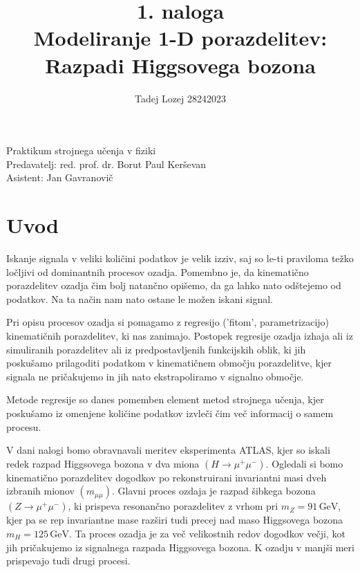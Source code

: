 \documentclass[slovene,11pt,a4paper]{article}
\begin{document}
\title{1. naloga \\ Modeliranje 1-D porazdelitev: Razpadi Higgsovega bozona}
\author{Tadej Lozej 28242023}
\maketitle

\begin{center}
Praktikum strojnega učenja v fiziki \\
\bigskip
Predavatelj: red. prof. dr. Borut Paul Kerševan \\
Asistent: Jan Gavranovič
\end{center}

\newpage

\tableofcontents

\newpage


\section{Uvod}

Iskanje signala v veliki količini podatkov je velik izziv, saj so le-ti praviloma težko ločljivi od dominantnih procesov ozadja. Pomembno je, da kinematično porazdelitev ozadja čim bolj natančno opišemo, da ga lahko nato odštejemo od podatkov. Na ta način nam nato ostane le možen iskani signal.

Pri opisu procesov ozadja si pomagamo z regresijo ('fitom', parametrizacijo) kinematičnih porazdelitev, ki nas zanimajo. Postopek regresije ozadja izhaja ali iz simuliranih porazdelitev ali iz predpostavljenih funkcijskih oblik, ki jih poskušamo prilagoditi podatkom v kinematičnem območju porazdelitve, kjer signala ne pričakujemo in jih nato ekstrapoliramo v signalno območje.

Metode regresije so danes pomemben element metod strojnega učenja, kjer poskušamo iz omenjene količine podatkov izvleči čim več informacij o samem procesu.

V dani nalogi bomo obravnavali meritev eksperimenta ATLAS, kjer so iskali redek razpad Higgsovega bozona v dva miona $(H \rightarrow \mu^+ \mu^-)$. Ogledali si bomo kinematično porazdelitev dogodkov po rekonstruirani invariantni masi dveh izbranih mionov $(m_{\mu\mu})$. Glavni proces ozdaja je razpad šibkega bozona $(Z \rightarrow \mu^+ \mu^-)$, ki prispeva
resonančno porazdelitev z vrhom pri $m_Z = 91 \, \text{GeV}$, kjer pa se rep invariantne mase razširi tudi precej nad maso Higgsovega bozona $m_H = 125 \, \text{GeV}$. Ta proces ozadja je za več velikostnih redov dogodkov večji, kot jih pričakujemo iz signalnega razpada Higgsovega bozona. K ozadju v manjši meri prispevajo tudi drugi procesi.
\end{document}
